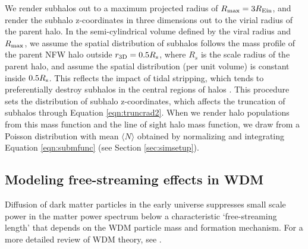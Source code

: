 We render subhalos out to a maximum projected radius of $R_{\rm{max}} = 3 R_{\rm{Ein}}$, and render the subhalo z-coordinates in three dimensions out to the virial radius of the parent halo. In the semi-cylindrical volume defined by the viral radius and $R_{\rm{max}}$, we assume the spatial distribution of subhalos follows the mass profile of the parent NFW halo outside $r_{\rm{3D}} = 0.5 R_{\rm{s}}$, where $R_s$ is the scale radius of the parent halo, and assume the spatial distribution (per unit volume) is constant inside $0.5 R_{\rm{s}}$. This reflects the impact of tidal stripping, which tends to preferentially destroy subhalos in the central regions of halos \cite{JiangvdB17}. This procedure sets the distribution of subhalo z-coordinates, which affects the truncation of subhalos through Equation \ref{eqn:truncrad2}. When we render halo populations from this mass function and the line of sight halo mass function, we draw from a Poisson distribution with mean $\langle N \rangle$ obtained by normalizing and integrating Equation \ref{eqn:submfunc} (see Section \ref{sec:simsetup}).

\subsection{Modeling free-streaming effects in WDM}
\label{ssec:wdmmodel}

Diffusion of dark matter particles in the early universe suppresses small scale power in the matter power spectrum below a characteristic `free-streaming length' that depends on the WDM particle mass and formation mechanism. For a more detailed review of WDM theory, see \cite{Benson++13,Schneider++13}.

